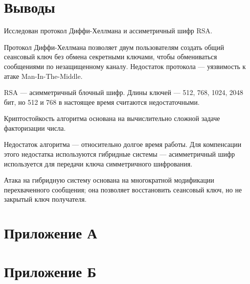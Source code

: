 \documentclass[a4paper, 14pt]{extarticle}
\begin{document}
\section{Выводы}
Исследован протокол Диффи-Хеллмана и ассиметричный шифр RSA.\@

Протокол Диффи-Хеллмана позволяет двум пользователям создать общий сеансовый ключ без обмена секретными ключами, чтобы обмениваться сообщениями по незащищенному каналу. Недостаток протокола --- уязвимость к атаке Man-In-The-Middle.

RSA --- асимметричный блочный шифр. Длины ключей --- 512, 768, 1024, 2048 бит, но 512 и 768 в настоящее время считаются недостаточными. 

Криптостойкость алгоритма основана на вычислительно сложной задаче факторизации числа.

Недостаток алгоритма --- относительно долгое время работы. Для компенсации этого недостатка используются гибридные системы --- асимметричный шифр используется для передачи ключа симметричного шифрования.

Атака на гибридную систему основана на многократной модификации перехваченного сообщения; она позволяет восстановить сеансовый ключ, но не закрытый ключ получателя.

\clearpage
\StartAddons{}
\section*{Приложение А}
{\small

}

\clearpage
\section*{Приложение Б}
{\small

}
\end{document}
